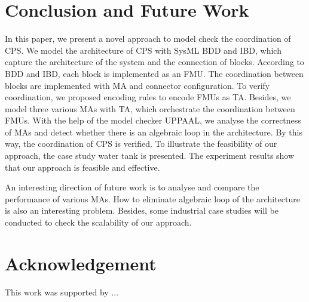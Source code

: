 \section{Conclusion and Future Work}
\label{sec:conclusion&ack}
In this paper, we present a novel approach to model check the coordination of CPS.  We model the architecture of CPS with SysML BDD and IBD, which capture the architecture of the system and the connection of blocks. According to BDD and IBD, each block is implemented as an FMU. The coordination between blocks are implemented with MA and connector configuration. To verify coordination, we proposed encoding rules to encode FMUs as TA. Besides, we model three various MAs with TA, which orchestrate the coordination between FMUs. With the help of the model checker UPPAAL, we  analyse the correctness of MAs and detect whether there is an algebraic loop in the architecture. By this way, the coordination of CPS is verified. To illustrate the feasibility of our approach, the case study water tank is presented. The experiment results show that our approach is feasible and effective. 

An interesting direction of future work is to analyse and compare the performance of various MAs. How to eliminate algebraic loop of the architecture is also an interesting problem. Besides, some industrial case studies will be conducted to check the scalability of our approach.
\section*{Acknowledgement}
This work was supported by ...



